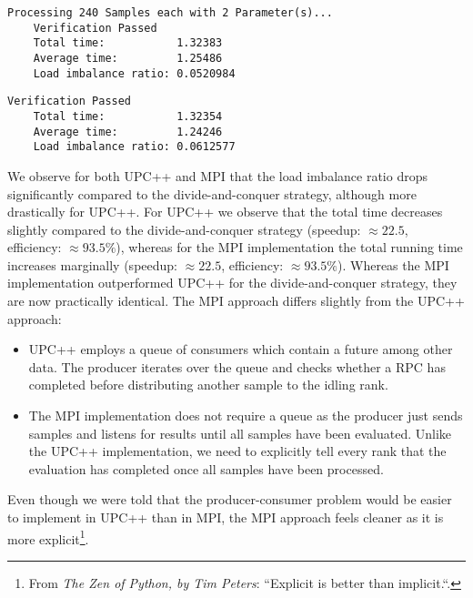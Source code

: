 \documentclass[11pt]{article}
\begin{document}
    \begin{lstlisting}[basicstyle=\tiny, frame=single, caption={Output from
    executing the UPC++ tasking engine with the producer-consumer strategy.},
    label={lst:Task2bUPCXX}]
    Processing 240 Samples each with 2 Parameter(s)...
    Verification Passed
    Total time:           1.32383
    Average time:         1.25486
    Load imbalance ratio: 0.0520984
    \end{lstlisting}

    \begin{lstlisting}[basicstyle=\tiny, frame=single, caption={Output from
    executing the MPI tasking engine with the producer-consumer strategy.},
    label={lst:Task2bMPI}]
    Verification Passed
    Total time:           1.32354
    Average time:         1.24246
    Load imbalance ratio: 0.0612577
    \end{lstlisting}

    We observe for both UPC++ and MPI that the load imbalance ratio drops
    significantly compared to the divide-and-conquer strategy, although more
    drastically for UPC++.
    For UPC++ we observe that the total time decreases slightly compared to
    the divide-and-conquer strategy (speedup: $\approx 22.5$, efficiency:
    $\approx 93.5\%$), whereas for the MPI implementation the total running
    time increases marginally (speedup: $\approx 22.5$, efficiency:
    $\approx 93.5\%$).
    Whereas the MPI implementation outperformed UPC++ for the
    divide-and-conquer strategy, they are now practically identical.
    The MPI approach differs slightly from the UPC++ approach:
    \begin{itemize}
        \item UPC++ employs a queue of consumers which contain a future among
        other data.
        The producer iterates over the queue and checks whether a RPC has
        completed before distributing another sample to the idling rank.
        \item The MPI implementation does not require a queue as the
        producer just sends samples and listens for results until all
        samples have been evaluated.
        Unlike the UPC++ implementation, we need to explicitly tell every
        rank that the evaluation has completed once all samples have been
        processed.
    \end{itemize}
    Even though we were told that the producer-consumer problem would be
    easier to implement in UPC++ than in MPI, the MPI approach feels cleaner
    as it is more explicit\footnote{From \emph{The Zen of Python, by Tim
    Peters}: ``Explicit is better than implicit.``.}.
\end{document}
